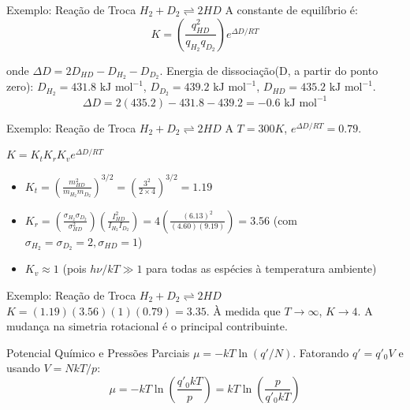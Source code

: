 \documentclass{beamer}
\begin{document}
\begin{frame}{Exemplo: Reação de Troca $H_2 + D_2 \rightleftharpoons 2HD$}
    A constante de equilíbrio é:
    $$ K = \left(\frac{q_{HD}^2}{q_{H_2}q_{D_2}}\right) e^{\Delta D/RT} $$
    
    onde $\Delta D = 2D_{HD} - D_{H_2} - D_{D_2}$. 
    Energia de dissociação(D, a partir do ponto zero): $D_{H_2} = 431.8 \text{ kJ mol}^{-1}$, $D_{D_2} = 439.2 \text{ kJ mol}^{-1}$, $D_{HD} = 435.2 \text{ kJ mol}^{-1}$.
    $$ \Delta D = 2(435.2) - 431.8 - 439.2 = -0.6 \text{ kJ mol}^{-1} $$
    
\end{frame}

\begin{frame}{Exemplo: Reação de Troca $H_2 + D_2 \rightleftharpoons 2HD$}
    A $T=300K$, $e^{\Delta D/RT} = 0.79$. 

    $K = K_t K_r K_v e^{\Delta D/RT}$
    \begin{itemize}
        \item $K_t = \left(\frac{m_{HD}^2}{m_{H_2}m_{D_2}}\right)^{3/2} = \left(\frac{3^2}{2 \times 4}\right)^{3/2} = 1.19$
        \item $K_r = \left(\frac{\sigma_{H_2}\sigma_{D_2}}{\sigma_{HD}^2}\right) \left(\frac{I_{HD}^2}{I_{H_2}I_{D_2}}\right) = 4 \left(\frac{(6.13)^2}{(4.60)(9.19)}\right) = 3.56$ (com $\sigma_{H_2}=\sigma_{D_2}=2, \sigma_{HD}=1$)
        \item $K_v \approx 1$ (pois $h\nu/kT \gg 1$ para todas as espécies à temperatura ambiente)
    \end{itemize}
    
\end{frame}

\begin{frame}{Exemplo: Reação de Troca $H_2 + D_2 \rightleftharpoons 2HD$}
    $ K = (1.19)(3.56)(1)(0.79) = 3.35 $.
    À medida que $T \rightarrow \infty$, $K \rightarrow 4$. A mudança na simetria rotacional é o principal contribuinte.
\end{frame}

\begin{frame}{Potencial Químico e Pressões Parciais}
        $\mu = -kT \ln(q'/N)$. Fatorando $q' = q'_0 V$ e usando $V=NkT/p$:
        $$ \mu = -kT \ln\left(\frac{q'_0 kT}{p}\right) = kT \ln\left(\frac{p}{q'_0 kT}\right) $$
        
\end{frame}
\end{document}
